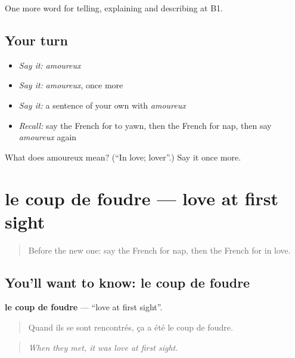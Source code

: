 \begin{grammarlens}[title={What you've built}]
One more word for telling, explaining and describing at B1.
\end{grammarlens}

\subsection*{Your turn}
\begin{itemize}
\raggedright
  \item \emph{Say it:} \emph{amoureux}
  \item \emph{Say it:} \emph{amoureux}, once more
  \item \emph{Say it:} a sentence of your own with \emph{amoureux}
  \item \emph{Recall:} say the French for to yawn, then the French for nap, then say \emph{amoureux} again
\end{itemize}

\begin{tcolorbox}[breakable,colback=teal!4,colframe=teal!35!black,title={Before you move on}]
What does amoureux mean? (\textquotedblleft{}In love; lover\textquotedblright{}.) Say it once more.
\end{tcolorbox}
\section[le coup de foudre]{le coup de foudre — love at first sight}

\label{lesson:FR-C487-coup-de-foudre}



\begin{quote}
Before the new one: say the French for nap, then the French for in love.
\end{quote}

\subsection*{You'll want to know: le coup de foudre}
\textbf{le coup de foudre} — \textquotedblleft{}love at first sight\textquotedblright{}.

\begin{quote}
Quand ils se sont rencontrés, ça a été le coup de foudre.
\end{quote}

\begin{quote}
\emph{When they met, it was love at first sight.}
\end{quote}

